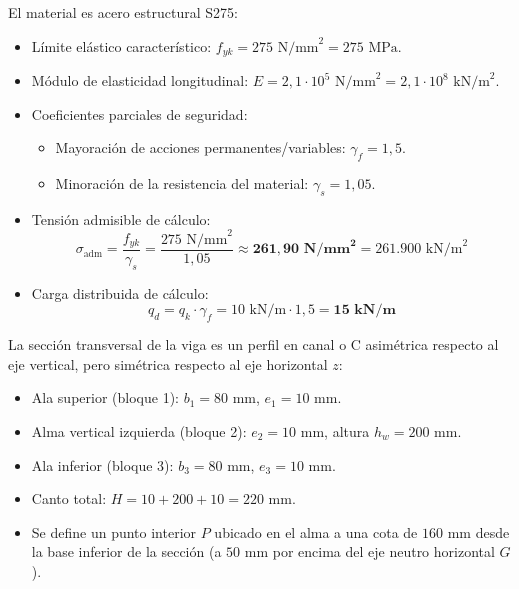 El material es acero estructural S275:
\begin{itemize}
    \item Límite elástico característico: $f_{yk} = 275\text{ N/mm}^2 = 275\text{ MPa}$.
    \item Módulo de elasticidad longitudinal: $E = 2{,}1 \cdot 10^5\text{ N/mm}^2 = 2{,}1 \cdot 10^8\text{ kN/m}^2$.
    \item Coeficientes parciales de seguridad:
          \begin{itemize}
              \item Mayoración de acciones permanentes/variables: $\gamma_f = 1{,}5$.
              \item Minoración de la resistencia del material: $\gamma_s = 1{,}05$.
          \end{itemize}
    \item Tensión admisible de cálculo:
          \begin{equation}
              \sigma_{\text{adm}} = \frac{f_{yk}}{\gamma_s} = \frac{275\text{ N/mm}^2}{1{,}05} \approx \mathbf{261{,}90\text{ N/mm}^2} = 261.900\text{ kN/m}^2
          \end{equation}
    \item Carga distribuida de cálculo:
          \begin{equation}
              q_d = q_k \cdot \gamma_f = 10\text{ kN/m} \cdot 1{,}5 = \mathbf{15\text{ kN/m}}
          \end{equation}
\end{itemize}

La sección transversal de la viga es un perfil en canal o C asimétrica respecto al eje vertical, pero simétrica respecto al eje horizontal $z$:
\begin{itemize}
    \item Ala superior (bloque 1): $b_1 = 80\text{ mm}$, $e_1 = 10\text{ mm}$.
    \item Alma vertical izquierda (bloque 2): $e_2 = 10\text{ mm}$, altura $h_w = 200\text{ mm}$.
    \item Ala inferior (bloque 3): $b_3 = 80\text{ mm}$, $e_3 = 10\text{ mm}$.
    \item Canto total: $H = 10 + 200 + 10 = 220\text{ mm}$.
    \item Se define un punto interior $P$ ubicado en el alma a una cota de $160\text{ mm}$ desde la base inferior de la sección (a $50\text{ mm}$ por encima del eje neutro horizontal $G$).
\end{itemize}

